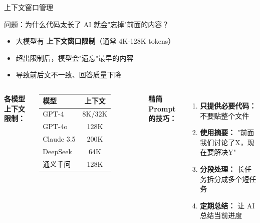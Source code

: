 \begin{frame}{上下文窗口管理}
	\begin{alertblock}{问题：为什么代码太长了 AI 就会"忘掉"前面的内容？}
		\begin{itemize}
			\item 大模型有 \textbf{上下文窗口限制}（通常 4K-128K tokens）
			\item 超出限制后，模型会"遗忘"最早的内容
			\item 导致前后文不一致、回答质量下降
		\end{itemize}
	\end{alertblock}

	\vspace{0.3cm}

	\begin{columns}
		\textbf{各模型上下文限制：}
		\begin{table}
			\centering
			\small
			\begin{tabular}{lc}
				\toprule
				\textbf{模型} & \textbf{上下文} \\
				\midrule
				GPT-4       & 8K/32K       \\
				GPT-4o      & 128K         \\
				Claude 3.5  & 200K         \\
				DeepSeek    & 64K          \\
				通义千问        & 128K         \\
				\bottomrule
			\end{tabular}
		\end{table}

		\textbf{精简 Prompt 的技巧：}
		\begin{enumerate}
			\item \textbf{只提供必要代码：} 不要贴整个文件
			\item \textbf{使用摘要：} "前面我们讨论了X，现在要解决Y"
			\item \textbf{分段处理：} 长任务拆分成多个短任务
			\item \textbf{定期总结：} 让 AI 总结当前进度
		\end{enumerate}
	\end{columns}
\end{frame}
